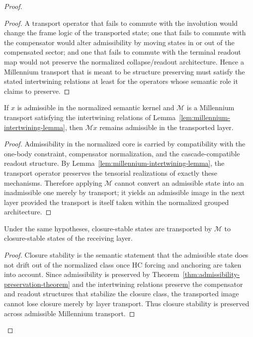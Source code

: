 \begin{proof}
\begin{proof}
A transport operator that fails to commute with the involution would change the
frame logic of the transported state; one that fails to commute with the
compensator would alter admissibility by moving states in or out of the
compensated sector; and one that fails to commute with the terminal readout map
would not preserve the normalized collapse/readout architecture. Hence a
Millennium transport that is meant to be structure preserving must satisfy the
stated intertwining relations at least for the operators whose semantic role it
claims to preserve.
\end{proof}

\begin{theorem}
\label{thm:admissibility-preservation-theorem}
If $x$ is admissible in the normalized semantic kernel and $\mathcal M$ is a
Millennium transport satisfying the intertwining relations of
Lemma~\ref{lem:millennium-intertwining-lemma}, then $\mathcal Mx$ remains
admissible in the transported layer.
\end{theorem}

\begin{proof}
Admissibility in the normalized core is carried by compatibility with the one-body
constraint, compensator normalization, and the cascade-compatible readout
structure. By Lemma~\ref{lem:millennium-intertwining-lemma}, the transport
operator preserves the tensorial realizations of exactly these mechanisms.
Therefore applying $\mathcal M$ cannot convert an admissible state into an
inadmissible one merely by transport; it yields an admissible image in the next
layer provided the transport is itself taken within the normalized grouped
architecture.
\end{proof}

\begin{theorem}
\label{thm:closure-preservation-theorem}
Under the same hypotheses, closure-stable states are transported by
$\mathcal M$ to closure-stable states of the receiving layer.
\end{theorem}

\begin{proof}
Closure stability is the semantic statement that the admissible state does not
drift out of the normalized class once HC forcing and anchoring are taken into
account. Since admissibility is preserved by
Theorem~\ref{thm:admissibility-preservation-theorem} and the intertwining
relations preserve the compensator and readout structures that stabilize the
closure class, the transported image cannot lose closure merely by layer
transport. Thus closure stability is preserved across admissible Millennium
transport.
\end{proof}


\end{proof}
